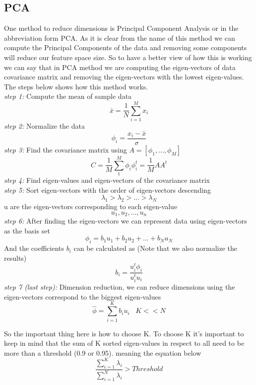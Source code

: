 \documentclass{article}
\begin{document}
\subsection{PCA}
One method to reduce dimensions is Principal Component Analysis or in the abbreviation form PCA. As it is clear from the name of this method we can compute the Principal Components of the data and removing some components will reduce our feature space size. So to have a better view of how this is working we can say that in PCA method we are computing the eigen-vectors of data covariance matrix and removing the eigen-vectors with the lowest eigen-values. The steps below shows how this method works. \\
\textit{step 1:} Compute the mean of sample data
\begin{equation}
    \bar{x} = \frac{1}{N} \sum_{i=1}^{M} x_i
\end{equation}
\textit{step 2:} Normalize the data
\begin{equation}
    \phi_i = \frac{x_i - \bar{x} }{\sigma} 
\end{equation}
\textit{step 3:} Find the covariance matrix using $A=[\phi_1, ..., \phi_M]$
\begin{equation}
    C = \frac{1}{M} \sum_{1}^{M} \phi_i \phi_i^t = \frac{1}{M} AA^t
\end{equation}
\textit{step 4:} Find eigen-values and eigen-vectors of the covariance matrix \\
\textit{step 5:} Sort eigen-vectors with the order of eigen-vectors descending
\begin{equation}
    \lambda_1 > \lambda_2 > ... > \lambda_N
\end{equation}
u are the eigen-vectors corresponding to each eigen-value
\begin{equation}
        u_1, u_2, ..., u_n
\end{equation}
\textit{step 6:} After finding the eigen-vectors we can represent data using eigen-vectors as the basis set
\begin{equation}
    \phi_i = b_1 u_1 + b_2 u_2 + ... + b_N u_N
\end{equation}
And the coefficients $b_i$ can be calculated as (Note that we also normalize the results)
\begin{equation}
    b_i = \frac{u_i^t \phi_i}{u_i^t u_i}
\end{equation}
\textit{step 7 (last step):} Dimension reduction, we can reduce dimensions using the eigen-vectors correspond to the biggest eigen-values
\begin{equation}
    \hat{\phi} = \sum_{i=1}^{K} b_i u_i \; \; \; K << N
\end{equation}
\par
So the important thing here is how to choose K. To choose K it's important to keep in mind that the sum of K sorted eigen-values in respect to all need to be more than a threshold (0.9 or 0.95). meaning the equation below
\begin{equation}
    \frac{\sum_{i=1}^{K} \lambda_i}{ \sum_{i=1}^{N} \lambda_i} > Threshold
\end{equation}
\end{document}
